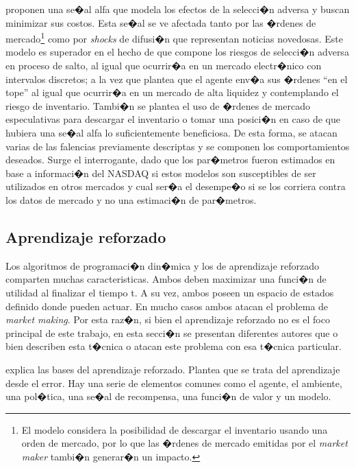 \documentclass[12pt,a4paper,spanish]{article}%
\begin{document}
\cite{Cartea2019} proponen una se�al alfa que modela los efectos de la selecci�n adversa y buscan minimizar sus costos. Esta se�al se ve afectada tanto por las �rdenes de mercado\footnote{El modelo considera la posibilidad de descargar el inventario usando una orden de mercado, por lo que las �rdenes de mercado emitidas por el \textit{market maker} tambi�n generar�n un impacto.} como por \textit{shocks} de difusi�n que representan noticias novedosas. Este modelo es superador en el hecho de que compone los riesgos de selecci�n adversa en proceso de salto, al igual que ocurrir�a en un mercado electr�nico con intervalos discretos; a la vez que plantea que el agente env�a sus �rdenes ``en el tope'' al igual que ocurrir�a en un mercado de alta liquidez y contemplando el riesgo de inventario. Tambi�n se plantea el uso de �rdenes de mercado especulativas para descargar el inventario o tomar una posici�n en caso de que hubiera una se�al alfa lo suficientemente beneficiosa. De esta forma, se atacan varias de las falencias previamente descriptas y se componen los comportamientos deseados. Surge el interrogante, dado que los par�metros fueron estimados en base a informaci�n del NASDAQ si estos modelos son susceptibles de ser utilizados en otros mercados y cual ser�a el desempe�o si se los corriera contra los datos de mercado y no una estimaci�n de par�metros.

\subsection{Aprendizaje reforzado}
Los algoritmos de programaci�n din�mica y los de aprendizaje reforzado comparten muchas caracteristicas. Ambos deben maximizar una funci�n de utilidad al finalizar el tiempo t. A su vez, ambos poseen un espacio de estados definido donde pueden actuar. En mucho casos ambos atacan el problema de \textit{market making}. Por esta raz�n, si bien el aprendizaje reforzado no es el foco principal de este trabajo, en esta secci�n se presentan diferentes autores que o bien describen esta t�cnica o atacan este problema con esa t�cnica particular.

\cite{RichardS.Sutton2018} explica las bases del aprendizaje reforzado. Plantea que se trata del aprendizaje desde el error. Hay una serie de elementos comunes como el agente, el ambiente, una pol�tica, una se�al de recompensa, una funci�n de valor y un modelo. 
\end{document}
